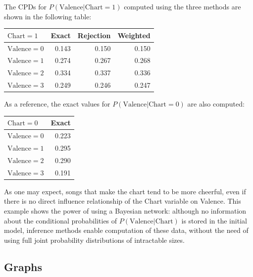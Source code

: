 \documentclass[a4paper, 12pt]{article}
\begin{document}
The CPDs for $P\left(\mathrm{Valence} | \mathrm{Chart} = 1\right)$ computed using the three methods are shown in the following table:
\begin{center}
    \begin{tabular}{lrrr}
        \toprule
        $\mathrm{Chart} = 1$    & Exact & Rejection & Weighted  \\
        \midrule
        $\mathrm{Valence} = 0$  & 0.143 & 0.150     & 0.150     \\
        $\mathrm{Valence} = 1$  & 0.274 & 0.267     & 0.268     \\
        $\mathrm{Valence} = 2$  & 0.334 & 0.337     & 0.336     \\
        $\mathrm{Valence} = 3$  & 0.249 & 0.246     & 0.247     \\
        \bottomrule
    \end{tabular}
\end{center}

As a reference, the exact values for $P\left(\mathrm{Valence} | \mathrm{Chart} = 0\right)$ are also computed:
\begin{center}
    \begin{tabular}{lr}
        \toprule
        $\mathrm{Chart} = 0$    & Exact \\
        \midrule
        $\mathrm{Valence} = 0$  & 0.223 \\
        $\mathrm{Valence} = 1$  & 0.295 \\
        $\mathrm{Valence} = 2$  & 0.290 \\
        $\mathrm{Valence} = 3$  & 0.191 \\
        \bottomrule
    \end{tabular}
\end{center}

As one may expect, songs that make the chart tend to be more cheerful, even if there is no direct influence relationship of the Chart variable on Valence. This example shows the power of using a Bayesian network: although no information about the conditional probabilities of $P\left(\mathrm{Valence} | \mathrm{Chart}\right)$ is stored in the initial model, inference methods enable computation of these data, without the need of using full joint probability distributions of intractable sizes.


\subsection{Graphs}
\end{document}
